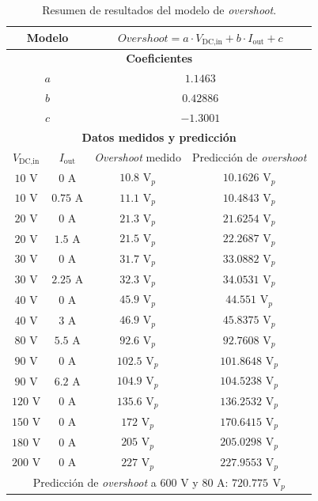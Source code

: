 \begin{table}[H]
	\centering
	\begin{tabular}{|c|c|c|c|}
		\hline
		\multicolumn{2}{|c|}{\textbf{Modelo}} & \multicolumn{2}{|c|}{$Overshoot = a \cdot V_{\text{DC,in}} + b \cdot I_{\text{out}} + c$} \\
		\hline
		\multicolumn{4}{|c|}{\textbf{Coeficientes}} \\
		\hline
		\multicolumn{2}{|c|}{$a$} & \multicolumn{2}{c|}{$1.1463$} \\
		\multicolumn{2}{|c|}{$b$} & \multicolumn{2}{c|}{$0.42886$} \\
		\multicolumn{2}{|c|}{$c$} & \multicolumn{2}{c|}{$-1.3001$} \\
		\hline
		\multicolumn{4}{|c|}{\textbf{Datos medidos y predicción}} \\
		\hline
		$V_{\text{DC,in}}$ & $I_{\text{out}}$ & \textit{Overshoot} medido & Predicción de \textit{overshoot} \\
		\hline
		$10$ V & $0$ A & $10.8$ $\text{V}_p$ & $10.1626$ $\text{V}_p$ \\
		$10$ V & $0.75$ A & $11.1$ $\text{V}_p$ & $10.4843$ $\text{V}_p$ \\
		$20$ V & $0$ A & $21.3$ $\text{V}_p$ & $21.6254$ $\text{V}_p$ \\
		$20$ V & $1.5$ A & $21.5$ $\text{V}_p$ & $22.2687$ $\text{V}_p$ \\
		$30$ V & $0$ A & $31.7$ $\text{V}_p$ & $33.0882$ $\text{V}_p$ \\
		$30$ V & $2.25$ A & $32.3$ $\text{V}_p$ & $34.0531$ $\text{V}_p$ \\
		$40$ V & $0$ A & $45.9$ $\text{V}_p$ & $44.551$ $\text{V}_p$ \\
		$40$ V & $3$ A & $46.9$ $\text{V}_p$ & $45.8375$ $\text{V}_p$ \\
		$80$ V & $5.5$ A & $92.6$ $\text{V}_p$ & $92.7608$ $\text{V}_p$ \\
		$90$ V & $0$ A & $102.5$ $\text{V}_p$ & $101.8648$ $\text{V}_p$ \\
		$90$ V & $6.2$ A & $104.9$ $\text{V}_p$ & $104.5238$ $\text{V}_p$ \\
		$120$ V & $0$ A & $135.6$ $\text{V}_p$ & $136.2532$ $\text{V}_p$ \\
		$150$ V & $0$ A & $172$ $\text{V}_p$ & $170.6415$ $\text{V}_p$ \\
		$180$ V & $0$ A & $205$ $\text{V}_p$ & $205.0298$ $\text{V}_p$ \\
		$200$ V & $0$ A & $227$ $\text{V}_p$ & $227.9553$ $\text{V}_p$ \\
		\hline
		\multicolumn{4}{|c|}{Predicción de \textit{overshoot} a $600$ V y $80$ A: {\color{red}\textbf{$720.775$ $\text{V}_p$}}} \\
		\hline
	\end{tabular}
	\caption{Resumen de resultados del modelo de \textit{overshoot}.}
\end{table}



